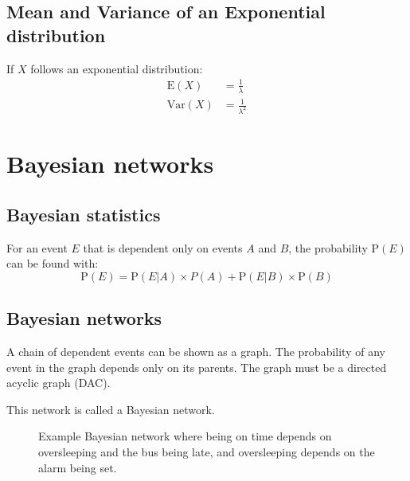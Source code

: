 \subsection{Mean and Variance of an Exponential distribution}
If \(X\) follows an exponential distribution:
\begin{align*}
    \mathrm{E}(X)   & = \frac{1}{\lambda}     \\
    \mathrm{Var}(X) & = \frac{1}{\lambda ^ 2}
\end{align*}

\section{Bayesian networks}
\subsection{Bayesian statistics}
For an event \(E\) that is dependent only on events \(A\) and \(B\), the probability \(\mathrm{P}(E)\) can be found with:
\begin{equation}
    \mathrm{P}(E) = \mathrm{P}(E | A) \times P(A) + \mathrm{P}(E | B) \times \mathrm{P}(B)
    \label{eq:dependent_probabilities}
\end{equation}

\subsection{Bayesian networks}
A chain of dependent events can be shown as a graph. The probability of any event in the graph depends only on its parents. The graph must be a directed acyclic graph (DAC).

This network is called a Bayesian network.

\begin{figure}[htbp]
    \centering
    \caption{Example Bayesian network where being on time depends on oversleeping and the bus being late, and oversleeping depends on the alarm being set.}
    \label{fig:bayesian_network}
\end{figure}

